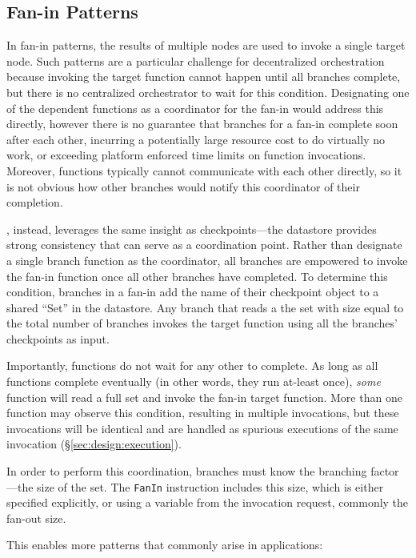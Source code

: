 \subsection{Fan-in Patterns}\label{sec:design:fanin}

In fan-in patterns, the results of multiple nodes are used to invoke a single
target node. Such patterns are a particular challenge for decentralized
orchestration because invoking the target function cannot happen until all
branches complete, but there is no centralized orchestrator to wait for this
condition. Designating one of the dependent functions as a coordinator for the
fan-in would address this directly, however there is no guarantee that branches
for a fan-in complete soon after each other, incurring a potentially large
resource cost to do virtually no work, or exceeding platform enforced time
limits on function invocations. Moreover, functions typically cannot communicate
with each other directly, so it is not obvious how other branches would notify
this coordinator of their completion.

\name{}, instead, leverages the same insight as checkpoints---the datastore
provides strong consistency that can serve as a coordination point. Rather than
designate a single branch function as the coordinator, all branches are
empowered to invoke the fan-in function once all other branches have completed.
To determine this condition, branches in a fan-in add the name of their
checkpoint object to a shared ``Set'' in the datastore. Any branch that reads a
the set with size equal to the total number of branches invokes the target
function using all the branches' checkpoints as input.

Importantly, functions do not wait for any other to complete. As long as all
functions complete eventually (in other words, they run at-least once),
\emph{some} function will read a full set and invoke the fan-in target function.
More than one function may observe this condition, resulting in multiple
invocations, but these invocations will be identical and are handled as spurious
executions of the same invocation (\S\ref{sec:design:execution}).

In order to perform this coordination, branches must know the branching
factor---the size of the set. The \texttt{FanIn} instruction includes this size,
which is either specified explicitly, or using a variable from the invocation
request, commonly the fan-out size.


This enables more patterns that commonly arise in applications:

